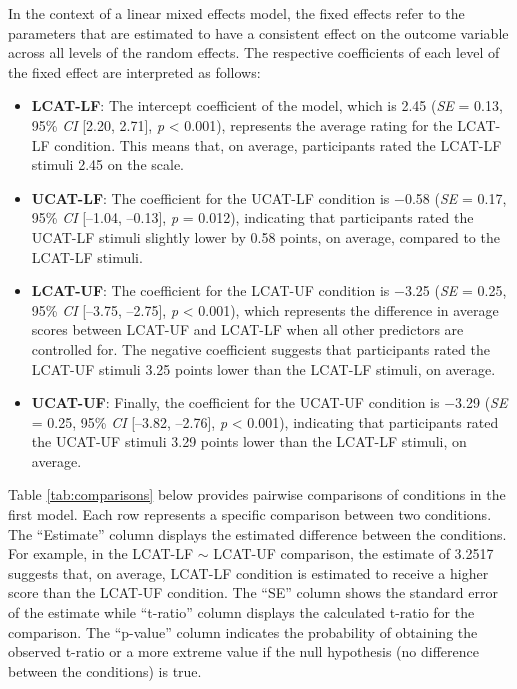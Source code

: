In the context of a linear mixed effects model, the fixed effects refer to the parameters that are estimated to have a consistent effect on the outcome variable across all levels of the random effects. The respective coefficients of each level of the fixed effect are interpreted as follows:

\begin{itemize}
	\item \textbf{LCAT-LF}: The intercept coefficient of the model, which is 2.45 (\textit{SE} = 0.13, 95\% \textit{CI} [2.20, 2.71], \textit{p} < 0.001), represents the average rating for the LCAT-LF condition. This means that, on average, participants rated the LCAT-LF stimuli 2.45 on the scale. 
	
	\item \textbf{UCAT-LF}: The coefficient for the UCAT-LF condition is $-$0.58 (\textit{SE} = 0.17, 95\% \textit{CI} [--1.04, --0.13], \textit{p} = 0.012), indicating that participants rated the UCAT-LF stimuli slightly lower by 0.58 points, on average, compared to the LCAT-LF stimuli.
	
	\item \textbf{LCAT-UF}: The coefficient for the LCAT-UF condition is $-$3.25 (\textit{SE} = 0.25, 95\% \textit{CI} [--3.75, --2.75], \textit{p} < 0.001), which represents the difference in average scores between LCAT-UF and LCAT-LF when all other predictors are controlled for. The negative coefficient suggests that participants rated the LCAT-UF stimuli 3.25 points lower than the LCAT-LF stimuli, on average. 
	
	
	\item \textbf{UCAT-UF}: Finally, the coefficient for the UCAT-UF condition is $-$3.29 (\textit{SE} = 0.25, 95\% \textit{CI} [--3.82, --2.76], \textit{p} < 0.001), indicating that participants rated the UCAT-UF stimuli 3.29 points lower than the LCAT-LF stimuli, on average. 
\end{itemize}

Table \ref{tab:comparisons} below provides pairwise comparisons of conditions in the first model. Each row represents a specific comparison between two conditions. The ``Estimate'' column displays the estimated difference between the conditions. For example, in the LCAT-LF $\sim$ LCAT-UF comparison, the estimate of 3.2517 suggests that, on average, LCAT-LF condition is estimated to receive a higher score than the LCAT-UF condition. The ``SE'' column shows the standard error of the estimate while ``t-ratio'' column displays the calculated t-ratio for the comparison. The ``p-value'' column indicates the probability of obtaining the observed t-ratio or a more extreme value if the null hypothesis (no difference between the conditions) is true.

